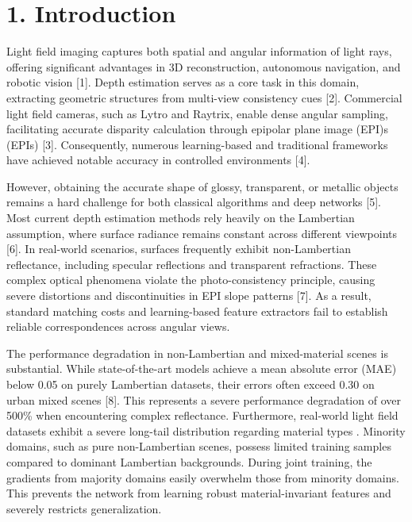 \section{1. Introduction}

Light field imaging captures both spatial and angular information of light rays, offering significant advantages in 3D reconstruction, autonomous navigation, and robotic vision [1]. Depth estimation serves as a core task in this domain, extracting geometric structures from multi-view consistency cues [2]. Commercial light field cameras, such as Lytro and Raytrix, enable dense angular sampling, facilitating accurate disparity calculation through epipolar plane image (EPI)s (EPIs) [3]. Consequently, numerous learning-based and traditional frameworks have achieved notable accuracy in controlled environments [4].

However, obtaining the accurate shape of glossy, transparent, or metallic objects remains a hard challenge for both classical algorithms and deep networks [5]. Most current depth estimation methods rely heavily on the Lambertian assumption, where surface radiance remains constant across different viewpoints [6]. In real-world scenarios, surfaces frequently exhibit non-Lambertian reflectance, including specular reflections and transparent refractions. These complex optical phenomena violate the photo-consistency principle, causing severe distortions and discontinuities in EPI slope patterns [7]. As a result, standard matching costs and learning-based feature extractors fail to establish reliable correspondences across angular views.

The performance degradation in non-Lambertian and mixed-material scenes is substantial. While state-of-the-art models achieve a mean absolute error (MAE) below 0.05 on purely Lambertian datasets, their errors often exceed 0.30 on urban mixed scenes [8]. This represents a severe performance degradation of over 500\% when encountering complex reflectance. Furthermore, real-world light field datasets exhibit a severe long-tail distribution regarding material types . Minority domains, such as pure non-Lambertian scenes, possess limited training samples compared to dominant Lambertian backgrounds. During joint training, the gradients from majority domains easily overwhelm those from minority domains. This prevents the network from learning robust material-invariant features and severely restricts generalization.

